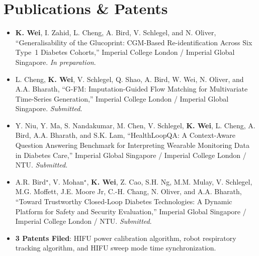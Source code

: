 \documentclass[a4paper,10pt]{article}
\newif\ifaimlver
\newenvironment{zitemize}{
\vspace{0.06cm}
\begin{itemize}\itemsep 1pt \parskip 1pt \parsep 3pt}
{\end{itemize}\vspace{-0.32cm}}
\begin{document}
\section{Publications \& Patents}
\begin{zitemize}
    \item \textbf{K. Wei}, I. Zahid, L. Cheng, A. Bird, V. Schlegel, and N. Oliver, ``Generalisability of the Glucoprint: CGM-Based Re-identification Across Six Type~1 Diabetes Cohorts,'' Imperial College London / Imperial Global Singapore. \textit{In preparation}.
    \item L. Cheng, \textbf{K. Wei}, V. Schlegel, Q. Shao, A. Bird, W. Wei, N. Oliver, and A.A. Bharath, ``G-FM: Imputation-Guided Flow Matching for Multivariate Time-Series Generation,'' Imperial College London / Imperial Global Singapore. \textit{Submitted}.
    \item Y. Niu, Y. Ma, S. Nandakumar, M. Chen, V. Schlegel, \textbf{K. Wei}, L. Cheng, A. Bird, A.A. Bharath, and S.K. Lam, ``HealthLoopQA: A Context-Aware Question Answering Benchmark for Interpreting Wearable Monitoring Data in Diabetes Care,'' Imperial Global Singapore / Imperial College London / NTU. \textit{Submitted}.
    \item A.R. Bird$^\star$, V. Mohan$^\star$, \textbf{K. Wei}, Z. Cao, S.H. Ng, M.M. Mulay, V. Schlegel, M.G. Moffett, J.E. Moore Jr, C.-H. Chang, N. Oliver, and A.A. Bharath, ``Toward Trustworthy Closed-Loop Diabetes Technologies: A Dynamic Platform for Safety and Security Evaluation,'' Imperial Global Singapore / Imperial College London / NTU. \textit{Submitted}.
    \item \textbf{3 Patents Filed}: HIFU power calibration algorithm, robot respiratory tracking algorithm, and HIFU sweep mode time synchronization.
\end{zitemize}
\else\ifaimlver
\section{Selected Publications}
\begin{zitemize}
    \item \textbf{K. Wei} et al., ``Glucoprint: CGM-Based Re-identification Across Six Type~1 Diabetes Cohorts'' (\textit{first author, in prep.}); co-author on \textit{G-FM} (flow-matching time-series generation) and \textit{HealthLoopQA} (clinical QA benchmark), both \textit{submitted 2026}.
\end{zitemize}
\fi\fi

\end{document}
